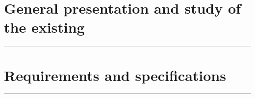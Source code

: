 \documentclass{polypfe}
\newcommand\mylocaltableofcontents{%
\begingroup
\renewcommand*{\contentsname}{\textcolor{black}{\textbf{Contents}}\\[-1.0em]\color{black}\rule{\textwidth}{1pt}}
\setcounter{secnumdepth}{3} %
\etocsettocdepth{3}

\localtableofcontents
\noindent\rule{\textwidth}{1pt}
\endgroup
}
\begin{document}
\pagestyle{fancy} 


\tableofcontents

\newpage

\listoffigures

\newpage

\listoftables

\newpage





\chapter{General presentation and study of the existing}
\mylocaltableofcontents
\newpage








\chapter{Requirements and specifications}
\mylocaltableofcontents
\newpage





%
%

\end{document}
